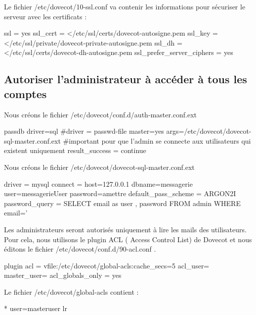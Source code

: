 \documentclass[a4paper,12pt,french]{report} %
\begin{document}
Le fichier /etc/dovecot/10-ssl.conf va contenir les informations pour sécuriser le serveur avec les certificats :
\begin{exempleConsole}
ssl = yes
ssl_cert = </etc/ssl/certs/dovecot-autosigne.pem
ssl_key = </etc/ssl/private/dovecot-private-autosigne.pem
ssl_dh = </etc/ssl/certs/dovecot-dh-autosigne.pem
ssl_prefer_server_ciphers = yes
\end{exempleConsole}

\subsection*{Autoriser l'administrateur à accéder à tous les comptes}
Nous créons le fichier /etc/dovecot/conf.d/auth-master.conf.ext 
\begin{exempleConsole}
passdb {
  driver=sql
  #driver = passwd-file
  master=yes
  args=/etc/dovecot/dovecot-sql-master.conf.ext
  #important pour que l'admin se connecte aux utilisateurs qui existent uniquement
  result_success = continue
}
\end{exempleConsole}

Nous créons le fichier /etc/dovecot/dovecot-sql-master.conf.ext 
\begin{exempleConsole}
driver = mysql
connect = host=127.0.0.1 dbname=messagerie user=messagerieUser password=amettre	
default_pass_scheme = ARGON2I
password_query = SELECT email as user , password FROM admin WHERE email='%
\end{exempleConsole}
\nocesure
Les administrateurs seront autorisés uniquement à lire les mails des utilisateurs. Pour cela, nous utilisons le plugin ACL ( Access Control List) de Dovecot et nous éditons le fichier /etc/dovecot/conf.d/90-acl.conf .
\begin{exempleConsole}
plugin {
	acl = vfile:/etc/dovecot/global-acls:cache_secs=5
	acl_user= %
	master_user= %
	acl_globals_only = yes
}	
\end{exempleConsole}

Le fichier /etc/dovecot/global-acls contient :
\begin{exempleConsole}
* user=masteruser lr	
\end{exempleConsole}
\end{document}
